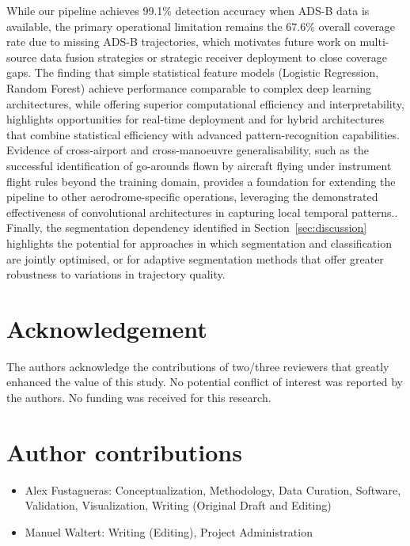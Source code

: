 \documentclass[
  manuscript=proceedings,  %
  layout=preprint,         %
  year=2025,
  volume=x,
]{extra/joas}
\begin{document}
While our pipeline achieves 99.1\% detection accuracy when ADS-B data is available, the primary operational limitation remains the 67.6\% overall coverage rate due to missing ADS-B trajectories, which motivates future work on multi-source data fusion strategies or strategic receiver deployment to close coverage gaps. The finding that simple statistical feature models (Logistic Regression, Random Forest) achieve performance comparable to complex deep learning architectures, while offering superior computational efficiency and interpretability, highlights opportunities for real-time deployment and for hybrid architectures that combine statistical efficiency with advanced pattern-recognition capabilities. Evidence of cross-airport and cross-manoeuvre generalisability, such as the successful identification of go-arounds flown by aircraft flying under instrument flight rules beyond the training domain, provides a foundation for extending the pipeline to other aerodrome-specific operations, leveraging the demonstrated effectiveness of convolutional architectures in capturing local temporal patterns.. Finally, the segmentation dependency identified in Section~\ref{sec:discussion} highlights the potential for approaches in which segmentation and classification are jointly optimised, or for adaptive segmentation methods that offer greater robustness to variations in trajectory quality.




\section*{Acknowledgement}
\label{sec:acknowledgement}
The authors acknowledge the contributions of two/three reviewers that greatly enhanced the value of this study. No potential conflict of interest was reported by the authors. No funding was received for this research.

\section*{Author contributions}
  \begin{itemize}
    \item Alex Fustagueras: Conceptualization, Methodology, Data Curation, Software, Validation, Visualization, Writing (Original Draft and Editing)
  \item Manuel Waltert: Writing (Editing), Project Administration
  \end{itemize}
\end{document}
